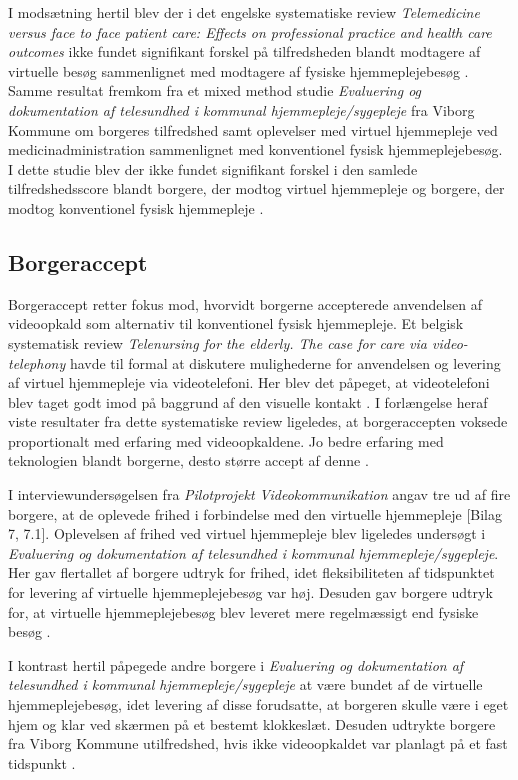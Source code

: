 I modsætning hertil blev der i det engelske systematiske review \textit{Telemedicine versus face to face patient care: Effects on professional practice and health care outcomes} ikke fundet signifikant forskel på tilfredsheden blandt modtagere af virtuelle besøg sammenlignet med modtagere af fysiske hjemmeplejebesøg \cite{Paf2}. 
\\Samme resultat fremkom fra et mixed method studie \textit{Evaluering og dokumentation af telesundhed i kommunal hjemmepleje/sygepleje} fra Viborg Kommune om borgeres tilfredshed samt oplevelser med virtuel hjemmepleje ved medicinadministration sammenlignet med konventionel fysisk hjemmeplejebesøg. I dette studie blev der ikke fundet signifikant forskel i den samlede tilfredshedsscore blandt borgere, der modtog virtuel hjemmepleje og borgere, der modtog konventionel fysisk hjemmepleje \cite{kandidat}.

\subsection{Borgeraccept}
Borgeraccept retter fokus mod, hvorvidt borgerne accepterede anvendelsen af videoopkald som alternativ til konventionel fysisk hjemmepleje. Et belgisk systematisk review \textit{Telenursing for the elderly. The case for care via video-telephony} havde til formal at diskutere mulighederne for anvendelsen og levering af virtuel hjemmepleje via videotelefoni. Her blev det påpeget, at videotelefoni blev taget godt imod på baggrund af den visuelle kontakt \cite{telenursing}. I forlængelse heraf viste resultater fra dette systematiske review ligeledes, at borgeraccepten voksede proportionalt med erfaring med videoopkaldene. Jo bedre erfaring med teknologien blandt borgerne, desto større accept af denne \cite{telenursing}.

I interviewundersøgelsen fra \textit{Pilotprojekt Videokommunikation} angav tre ud af fire borgere, at de oplevede frihed i forbindelse med den virtuelle hjemmepleje [Bilag 7, 7.1]. Oplevelsen af frihed ved virtuel hjemmepleje blev ligeledes undersøgt i \textit{Evaluering og dokumentation af telesundhed i kommunal hjemmepleje/sygepleje}. Her gav flertallet af borgere udtryk for frihed, idet fleksibiliteten af tidspunktet for levering af virtuelle hjemmeplejebesøg var høj. Desuden gav borgere udtryk for, at virtuelle hjemmeplejebesøg blev leveret mere regelmæssigt end fysiske besøg \cite{kandidat}.
 
I kontrast hertil påpegede andre borgere i \textit{Evaluering og dokumentation af telesundhed i kommunal hjemmepleje/sygepleje} at være bundet af de virtuelle hjemmeplejebesøg, idet levering af disse forudsatte, at borgeren skulle være i eget hjem og klar ved skærmen på et bestemt klokkeslæt. Desuden udtrykte borgere fra Viborg Kommune utilfredshed, hvis ikke videoopkaldet var planlagt på et fast tidspunkt \cite{kandidat}.
 
